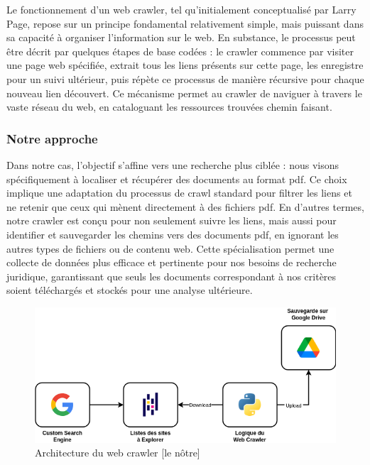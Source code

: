 Le fonctionnement d'un web crawler, tel qu'initialement conceptualisé par Larry Page, repose sur un principe fondamental relativement simple, mais puissant dans sa capacité à organiser l'information sur le web. En substance, le processus peut être décrit par quelques étapes de base codées : le crawler commence par visiter une page web spécifiée, extrait tous les liens présents sur cette page, les enregistre pour un suivi ultérieur, puis répète ce processus de manière récursive pour chaque nouveau lien découvert. Ce mécanisme permet au crawler de naviguer à travers le vaste réseau du web, en cataloguant les ressources trouvées chemin faisant.

\subsubsection{Notre approche}

Dans notre cas, l'objectif s'affine vers une recherche plus ciblée : nous visons spécifiquement à localiser et récupérer des documents au format \ac{pdf}. Ce choix implique une adaptation du processus de crawl standard pour filtrer les liens et ne retenir que ceux qui mènent directement à des fichiers \ac{pdf}. En d'autres termes, notre crawler est conçu pour non seulement suivre les liens, mais aussi pour identifier et sauvegarder les chemins vers des documents \ac{pdf}, en ignorant les autres types de fichiers ou de contenu web. Cette spécialisation permet une collecte de données plus efficace et pertinente pour nos besoins de recherche juridique, garantissant que seuls les documents correspondant à nos critères soient téléchargés et stockés pour une analyse ultérieure.

\begin{figure}[H]
    \centering
    \includegraphics[width=12 cm]{gfx/fig-crawler-architecture.png}
    \caption{Architecture du web crawler [le nôtre]}
    \label{fig:crawler-architecture}
\end{figure}

